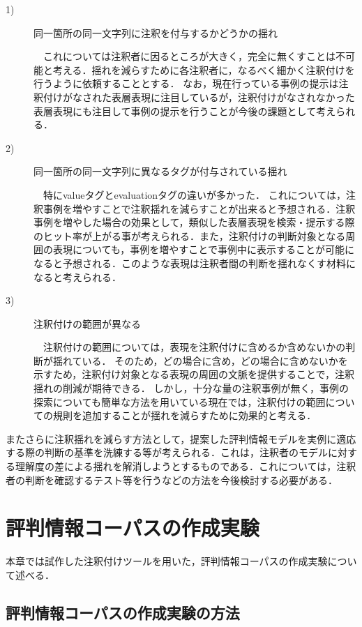\documentclass[japanese]{jnlp_1.4}
\begin{document}
\begin{description}
\item[1)]{同一箇所の同一文字列に注釈を付与するかどうかの揺れ}

　これについては注釈者に因るところが大きく，完全に無くすことは不可能と考える．揺れを減らすために各注釈者に，なるべく細かく注釈付けを行うように依頼することとする．
なお，現在行っている事例の提示は注釈付けがなされた表層表現に注目しているが，注釈付けがなされなかった表層表現にも注目して事例の提示を行うことが今後の課題として考えられる．
\item[2)]{同一箇所の同一文字列に異なるタグが付与されている揺れ}

　特にvalueタグとevaluationタグの違いが多かった．
これについては，注釈事例を増やすことで注釈揺れを減らすことが出来ると予想される．注釈事例を増やした場合の効果として，類似した表層表現を検索・提示する際のヒット率が上がる事が考えられる．また，注釈付けの判断対象となる周囲の表現についても，事例を増やすことで事例中に表示することが可能になると予想される．このような表現は注釈者間の判断を揺れなくす材料になると考えられる．

\item[3)]{注釈付けの範囲が異なる}

　注釈付けの範囲については，表現を注釈付けに含めるか含めないかの判断が揺れている．
そのため，どの場合に含め，どの場合に含めないかを示すため，注釈付け対象となる表現の周囲の文脈を提供することで，注釈揺れの削減が期待できる．
しかし，十分な量の注釈事例が無く，事例の探索についても簡単な方法を用いている現在では，注釈付けの範囲についての規則を追加することが揺れを減らすために効果的と考える．
\end{description}

またさらに注釈揺れを減らす方法として，提案した評判情報モデルを実例に適応する際の判断の基準を洗練する等が考えられる．これは，注釈者のモデルに対する理解度の差による揺れを解消しようとするものである．これについては，注釈者の判断を確認するテスト等を行うなどの方法を今後検討する必要がある．


\section{評判情報コーパスの作成実験}
\label{sec:評判情報コーパスの作成実験}

本章では試作した注釈付けツールを用いた，評判情報コーパスの作成実験について述べる．


\subsection{評判情報コーパスの作成実験の方法}
\label{sec:評判情報コーパスの作成実験の方法}
\end{document}
